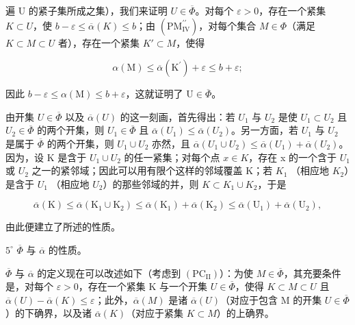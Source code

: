 遍 U 的紧子集所成之集），我们来证明 \(U \in \overline{\Phi}\)。对每个 \(\varepsilon > 0\)，存在一个紧集 \(K \subset U\)，使 \(b - \varepsilon \leqslant \overline{\alpha}(K) \leqslant b\)；由 \((\mathrm{PM}_{\mathrm{IV}}^{\prime\prime})\)，对每个集合 \(M \in \Phi\)（满足 \(K \subset M \subset U\) 者），存在一个紧集 \(K' \subset M\)，使得

\[
\alpha (\mathrm{M}) \leqslant \overline {{{{\alpha}}}} (\mathrm{K} ^ {\prime}) + \varepsilon \leqslant b + \varepsilon ;
\]

因此 \(b - \varepsilon \leqslant \alpha (\mathrm{M}) \leqslant b + \varepsilon\)，这就证明了 \(\mathrm{U} \in \overline{\Phi}\)。

由开集 \(U \in \overline{\Phi}\) 以及 \(\overline{\alpha}(U)\) 的这一刻画，首先得出：若 \(U_{1}\) 与 \(U_{2}\) 是使 \(U_{1} \subset U_{2}\) 且 \(U_{2} \in \overline{\Phi}\) 的两个开集，则 \(U_{1} \in \overline{\Phi}\) 且 \(\overline{\alpha}(U_{1}) \leqslant \overline{\alpha}(U_{2})\)。另一方面，若 \(U_{1}\) 与 \(U_{2}\) 是属于 \(\overline{\Phi}\) 的两个开集，则 \(U_{1} \cup U_{2}\) 亦然，且 \(\overline{\alpha}(U_{1} \cup U_{2}) \leqslant \overline{\alpha}(U_{1}) + \overline{\alpha}(U_{2})\)。因为，设 K 是含于 \(U_{1} \cup U_{2}\) 的任一紧集；对每个点 \(x \in K\)，存在 x 的一个含于 \(U_{1}\) 或 \(U_{2}\) 之一的紧邻域；因此可以用有限个这样的邻域覆盖 K；若 \(K_{1}\) （相应地 \(K_{2}\)）是含于 \(U_{1}\) （相应地 \(U_{2}\)）的那些邻域的并，则 \(K \subset K_{1} \cup K_{2}\)，于是

\[
\overline {{{{\alpha}}}} (\mathrm{K}) \leqslant \overline {{{{\alpha}}}} (\mathrm{K} _ {1} \cup \mathrm{K} _ {2}) \leqslant \overline {{{{\alpha}}}} (\mathrm{K} _ {1}) + \overline {{{{\alpha}}}} (\mathrm{K} _ {2}) \leqslant \overline {{{{\alpha}}}} (\mathrm{U} _ {1}) + \overline {{{{\alpha}}}} (\mathrm{U} _ {2}),
\]

由此便建立了所述的性质。

\(5^{\circ}\) \(\overline{\Phi}\) 与 \(\overline{\alpha}\) 的性质。

\(\overline{\Phi}\) 与 \(\overline{\alpha}\) 的定义现在可以改述如下（考虑到 \((\mathrm{PC}_{\mathrm{II}})\)）：为使 \(M \in \overline{\Phi}\)，其充要条件是，对每个 \(\varepsilon > 0\)，存在一个紧集 K 与一个开集 \(U \in \overline{\Phi}\)，使得 \(K \subset M \subset U\) 且 \(\overline{\alpha}(U) - \overline{\alpha}(K) \leqslant \varepsilon\)；此外，\(\overline{\alpha}(M)\) 是诸 \(\overline{\alpha}(U)\)（对应于包含 M 的开集 \(U \in \overline{\Phi}\)）的下确界，以及诸 \(\overline{\alpha}(K)\)（对应于紧集 \(K \subset M\)）的上确界。

